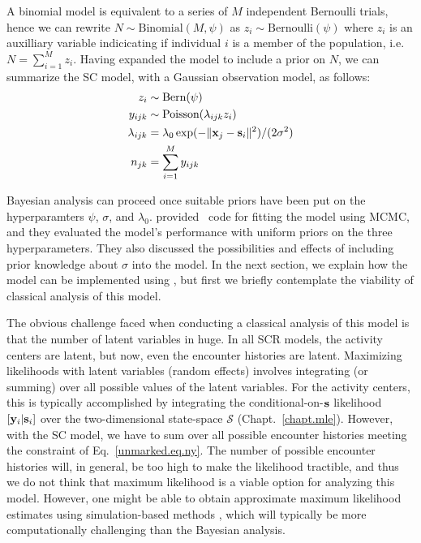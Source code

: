 A binomial model is
equivalent to a series of $M$ independent Bernoulli trials, hence
we can rewrite $N \sim \text{Binomial}(M, \psi)$ as $z_i \sim
\text{Bernoulli}(\psi)$ where $z_i$ is an auxilliary variable
indicicating if individual $i$ is a member of the population, i.e. $N =
\sum_{i=1}^M z_i$. Having expanded the model to include a prior on $N$, we
can summarize the SC model, with a Gaussian observation model, as follows:
\begin{align*}
  z_i &\sim \text{Bern}(\psi) \\
  y_{ijk} &\sim \text{Poisson}(\lambda_{ijk} z_i) \\
  \lambda_{ijk} &= \lambda_0\exp(-\|{\bf x}_j - {\bf s}_i\|^2)/(2\sigma^2) \\
  n_{jk} &= \sum_{i=1}^M y_{ijk} %
\end{align*}




Bayesian analysis can proceed once suitable priors have been put on
the hyperparamters $\psi$, $\sigma$, and
$\lambda_0$. \citet{chandler_royle:2012} provided \R~code for fitting
the model using MCMC, and they evaluated the model's performance with
uniform priors on the three hyperparameters. They also discussed the
possibilities and effects of including prior knowledge about $\sigma$
into the model. In the next section, we explain how the model can be
implemented using \jags, but first we briefly contemplate the viability of classical
analysis of this model.

The obvious challenge faced when conducting a classical analysis of
this model is that the number of latent variables in huge. In all SCR models, the activity centers are
latent, but now, even the encounter histories are latent.
Maximizing likelihoods with latent variables (random effects) involves
integrating (or summing) over all possible values of the latent
variables. For the activity centers, this is typically accomplished by
integrating the conditional-on-$\bf s$ likelihood $[{\bf y}_i|{\bf s}_i]$ over the two-dimensional
state-space $\mathcal{S}$ (Chapt.~\ref{chapt.mle}). However, with
the SC model, we have to sum
over all possible encounter histories %
meeting the
constraint of Eq.~\ref{unmarked.eq.ny}. The
number of possible encounter histories
will, in general, be too high to make the likelihood tractible,
and thus we do not think that maximum likelihood is a viable option
for analyzing this model. However, one might be able to obtain
approximate maximum
likelihood estimates using simulation-based methods
\citep{lele_etal:2010},
which will typically be more computationally
challenging than the Bayesian analysis.


